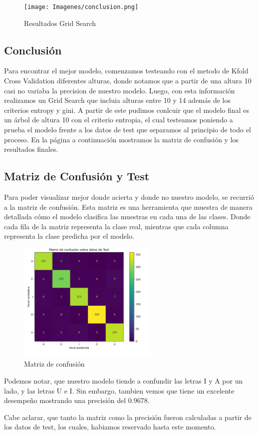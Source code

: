 \documentclass[10pt,a4paper]{article}
\begin{document}
\begin{figure}[h]
  \centering
  \texttt{[image: Imagenes/conclusion.png]}
  \caption{Resultados Grid Search}
  \label{fig:Tabla 1}
\end{figure}

\subsection{Conclusión}

Para encontrar el mejor modelo, comenzamos testeando con el metodo de Kfold Cross Validation diferentes alturas, donde notamos que a partir de una altura 10 casi no variaba la precision de nuestro modelo. Luego, con esta información realizamos un Grid Search que incluia alturas entre 10 y 14 además de los criterios entropy y gini. A partir de este pudimos conlcuir que el modelo final es un árbol de altura 10 con el criterio entropia, el cual testeamos poniendo a prueba el modelo frente a los datos de test que separamos al principio de todo el proceso. En la página a continuación mostramos la matriz de confusión y los resultados finales.

\newpage

\subsection{Matriz de Confusión y Test}

Para poder visualizar mejor donde acierta y donde no nuestro modelo, se recurrió a la matriz de confusión. Esta matriz es una herramienta que muestra de manera detallada cómo el modelo clasifica las muestras en cada una de las clases. Donde cada fila de la matriz representa la clase real, mientras que cada columna representa la clase predicha por el modelo.

\begin{figure}[ht]
  \centering
  \includegraphics[width=0.6\textwidth]{Imagenes/matriz_confusion_arbol.png}
  \caption{Matriz de confusión}
  \label{fig:Tabla 1}
\end{figure}

Podemos notar, que nuestro modelo tiende a confundir las letras I y A por un lado, y las letras U e I. Sin embargo, tambien vemos que tiene un excelente desempeño mostrando una precisión del 0.9678.

Cabe aclarar, que tanto la matriz como la precisión fueron calculadas a partir de los datos de test, los cuales, habiamos reservado hasta este momento.
\end{document}
